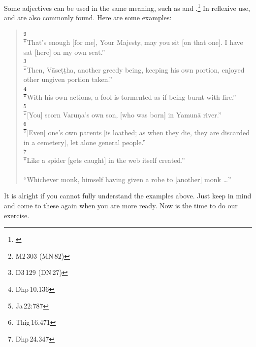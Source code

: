 Some adjectives can be used in the same meaning, such as  and .\footnote{\citealp[p.~299]{perniola:grammar}} In reflexive use,  and  are also commonly found. Here are some examples:

\begin{quote}
\footnote{M2\,303 (MN\,82)}\\
``That's enough [for me], Your Majesty, may you sit [on that one]. I have sat [here] on my own seat.''\\[1.5mm]
\footnote{D3\,129 (DN\,27)}\\
``Then, V\=ase\d t\d tha, another greedy being, keeping his own portion, enjoyed other ungiven portion taken.''\\[1.5mm]
\footnote{Dhp\,10.136}\\
``With his own actions, a fool is tormented as if being burnt with fire.''\\[1.5mm]
\footnote{Ja\,22:787}\\
``[You] scorn Varu\d na's own son, [who was born] in Yamun\=a river.''\\[1.5mm]
\footnote{Thig\,16.471}\\
``[Even] one's own parents [is loathed; as when they die, they are discarded in a cemetery], let alone general people.''\\[1.5mm]
\footnote{Dhp\,24.347}\\
``Like a spider [gets caught] in the web itself created.''\\[1.5mm]
\mbox{}\\
``Whichever monk, himself having given a robe to [another] monk \ldots''\\[1.5mm]
\end{quote}

It is alright if you cannot fully understand the examples above. Just keep in mind and come to these again when you are more ready. Now is the time to do our exercise.

